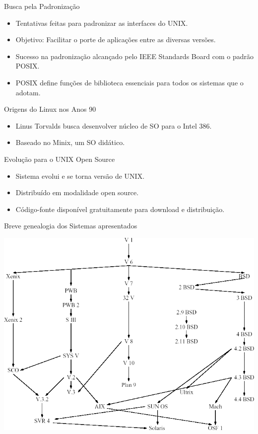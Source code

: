 \documentclass{beamer}
\begin{document}
\begin{frame}{Busca pela Padronização}
    \begin{itemize}
        \item Tentativas feitas para padronizar as interfaces do UNIX.
        \item Objetivo: Facilitar o porte de aplicações entre as diversas versões.
        \item Sucesso na padronização alcançado pelo IEEE Standards Board com o padrão POSIX.
        \item POSIX define funções de biblioteca essenciais para todos os sistemas que o adotam.
    \end{itemize}
\end{frame}
\begin{frame}{Origens do Linux nos Anos 90}
    \begin{itemize}
        \item Linus Torvalds busca desenvolver núcleo de SO para o Intel 386.
        \item Baseado no Minix, um SO didático.
    \end{itemize}
\end{frame}

\begin{frame}{Evolução para o UNIX Open Source}
    \begin{itemize}
        \item Sistema evolui e se torna versão de UNIX.
        \item Distribuído em modalidade open source.
        \item Código-fonte disponível gratuitamente para download e distribuição.
    \end{itemize}
\end{frame}

\begin{frame}{Breve genealogia dos Sistemas apresentados}
    \begin{center}
        \includegraphics[width=0.55\linewidth]{assets/aula-tads-sope/SO-unix-linux-1.png}
    \end{center}
\end{frame}
\end{document}
